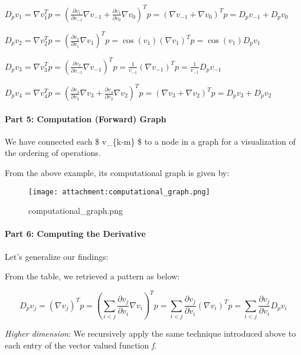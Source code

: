 \documentclass[11pt]{article}
\begin{document}
\(D_p v_{1} = \nabla v_{1}^T p = (\frac {\partial v_{1}} {\partial v_{-1}} \nabla v_{-1} + \frac {\partial v_{1}}{\partial v_{0}} \nabla v_{0})^T p = (\nabla v_{-1} + \nabla v_0)^T p = D_p v_{-1} + D_p v_0\)

\(D_p v_{2} = \nabla v_{2}^T p = (\frac {\partial v_{2}} {\partial v_{1}} \nabla v_1)^T p = \cos(v_1) (\nabla v_1)^T p = \cos(v_1) D_p v_1\)

\(D_p v_{3} = \nabla v_{3}^T p = (\frac {\partial v_{3}} {\partial v_{-1}} \nabla v_{-1})^T p = \frac {1} {v_{-1}} (\nabla v_{-1})^T p = \frac {1} {v_{-1}} D_p v_{-1}\)

\(D_p v_{4} = \nabla v_{4}^T p = (\frac {\partial v_{4}} {\partial v_3} \nabla v_{3} + \frac {\partial v_{4}}{\partial v_{2}} \nabla v_{2})^T p = (\nabla v_{3} + \nabla v_2)^T p = D_p v_{3} + D_p v_2\)

\hypertarget{part-5-computation-forward-graph}{%
\paragraph{Part 5: Computation (Forward)
Graph}\label{part-5-computation-forward-graph}}

We have connected each \$ v\_\{k-m\} \$ to a node in a graph for a
visualization of the ordering of operations.

From the above example, its computational graph is given by:

\begin{figure}
\centering
\texttt{[image: attachment:computational\_graph.png]}
\caption{computational\_graph.png}
\end{figure}

\hypertarget{part-6-computing-the-derivative}{%
\paragraph{Part 6: Computing the
Derivative}\label{part-6-computing-the-derivative}}

Let's generalize our findings:

From the table, we retrieved a pattern as below:

\[ D_p v_j = (\nabla v_j)^T p = (\sum_{i < j} \frac{\partial{v_j}} {\partial{v_i}} \nabla v_i)^T p = \sum_{i < j} \frac{\partial{v_j}} {\partial{v_i}} (\nabla v_i)^T p = \sum_{i < j} \frac{\partial{v_j}} {\partial{v_i}} D_p v_i\]

\emph{Higher dimension}: We recursively apply the same technique
introduced above to each entry of the vector valued function \emph{f}.
\end{document}
